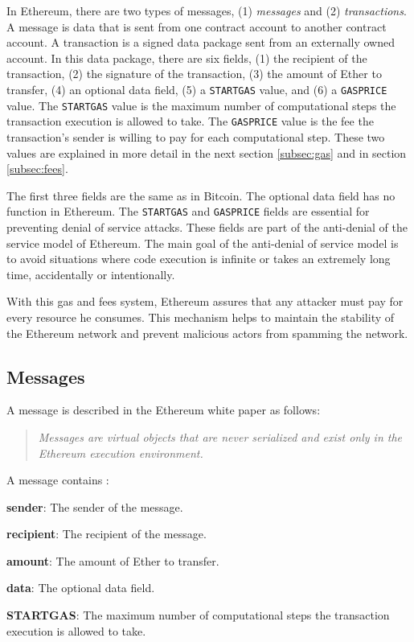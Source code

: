 In Ethereum, there are two types of messages, (1) \textit{messages} and (2) \textit{transactions}. A message is data that is sent from one contract
account to another contract account. A transaction is a signed data package sent from an externally owned account. In this data package, there are
six fields, (1) the recipient of the transaction, (2) the signature of the transaction, (3) the amount of Ether to transfer,
(4) an optional data field, (5) a \texttt{STARTGAS} value, and (6) a \texttt{GASPRICE} value. The \texttt{STARTGAS} value is the maximum number of computational
steps the transaction execution is allowed to take. The \texttt{GASPRICE} value is the fee the transaction's sender is willing to pay for each computational
step. These two values are explained in more detail in the next section \ref{subsec:gas} and in section \ref{subsec:fees}.


The first three fields are the same as in Bitcoin. The optional data field has no function in Ethereum. The \texttt{STARTGAS} and \texttt{GASPRICE} fields are
essential for preventing denial of service attacks. These fields are part of the anti-denial of the service model of Ethereum. The main goal of
the anti-denial of service model is to avoid situations where code execution is infinite or takes an extremely long time, accidentally
or intentionally.


With this gas and fees system, Ethereum assures that any attacker must pay for every resource he consumes. This mechanism helps
to maintain the stability of the Ethereum network and prevent malicious actors from spamming the network.



\subsection{Messages}

A message is described in the Ethereum white paper \cite{ethereum_white_paper} as follows:


\begin{quote}
   \textit{Messages are virtual objects that are never serialized and exist only in the Ethereum execution environment.}
\end{quote}


A message contains :


\begin{list}{-}{}
   \item \textbf{sender}: The sender of the message.
   \item \textbf{recipient}: The recipient of the message.
   \item \textbf{amount}: The amount of Ether to transfer.
   \item \textbf{data}: The optional data field.
   \item \textbf{STARTGAS}: The maximum number of computational steps the transaction execution is allowed to take.
\end{list}


